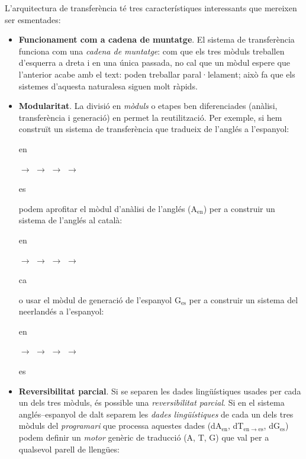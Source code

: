 L'arquitectura de transferència té tres característiques interessants
que mereixen ser esmentades:
\begin{itemize}
\item \textbf{Funcionament com a cadena de muntatge}. El sistema de
  transferència funciona com una \emph{cadena de muntatge}: com que
  els tres mòduls treballen d'esquerra a dreta i en una única passada,
  no cal que un mòdul espere que l'anterior acabe amb el text: poden
  treballar paral·lelament; això fa que els sistemes d'aquesta
  naturalesa siguen molt ràpids.
\item \textbf{Modularitat}. La divisió en \emph{mòduls}
  o etapes ben diferenciades (anàlisi, transferència i generació) en
  permet la reutilització. Per exemple, 
 si hem construït un sistema de transferència que tradueix de
    l'anglés a l'espanyol: 
    \begin{center}
 \parbox{0.5cm}{en} $\to$
  $\to$ 
  $\to$
  $\to$
 \parbox{0.5cm}{es} 
 \end{center}
 podem aprofitar el mòdul d'anàlisi de l'anglés (A\(_\mathrm{en}\)) per a construir un sistema
 de l'anglés al català:
 \begin{center}
 \parbox{0.5cm}{en} $\to$
  $\to$ 
  $\to$
  $\to$
 \parbox{0.5cm}{ca} 
 \end{center}
 o usar el mòdul de generació de l'espanyol G\(_\mathrm{es}\) per a
 construir un sistema del neerlandés a l'espanyol:
 \begin{center}
 \parbox{0.5cm}{en} $\to$
  $\to$ 
  $\to$
  $\to$
 \parbox{0.5cm}{es} 
 \end{center}
\item \textbf{Reversibilitat parcial}. 
Si se separen les dades
 lingüístiques usades per cada un dels tres mòduls, és possible una
 \emph{reversibilitat parcial}. 
Si en el sistema anglés--espanyol de
dalt separem les \emph{dades lingüístiques} de cada un dels tres
mòduls del \emph{programari} que processa aquestes dades
(dA\(_\mathrm{en}\), dT\(_\mathrm{en\to es}\), dG\(_\mathrm{es}\))
podem definir un \emph{motor} genèric de traducció (A, T, G) que val
per a qualsevol parell de llengües:

\end{itemize}
